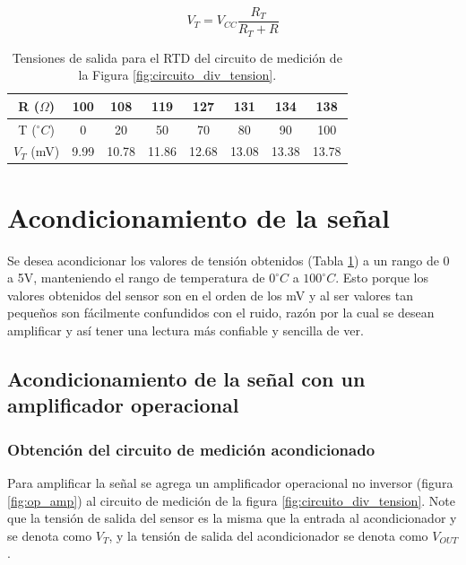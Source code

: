 \documentclass[journal,trans]{IEEEtran}
\begin{document}
\begin{equation} \label{eq:div_tension}
    V_{T} = V_{CC}\frac{R_{T}}{R_{T}+R}
\end{equation}

\begin{table}[htb]
    \begin{center}
        \caption{Tensiones de salida para el RTD del circuito de medición de la Figura \ref{fig:circuito_div_tension}.}
        \label{tab:tensiones_salida}
        \begin{tabular}{c | c | c | c | c | c | c | c}
            \hline
            R ($\Omega$) & 100 & 108 & 119 & 127 & 131 & 134 & 138 \\
            \hline
            T ($^{\circ}C$) & 0 & 20 & 50 & 70 & 80 & 90 & 100  \\
            \hline
            $V_{T}$ (mV) & 9.99 & 10.78 & 11.86 & 12.68 & 13.08 & 13.38 & 13.78  \\
            \hline
        \end{tabular}
    \end{center}
\end{table}


\section{Acondicionamiento de la señal }
Se desea acondicionar los valores de tensión obtenidos (Tabla \ref{tab:tensiones_salida}) a un rango de 0 a 5V, manteniendo el rango de temperatura de $0^{\circ}C$ a $100^{\circ}C$. Esto porque los valores obtenidos del sensor son en el orden de los mV y al ser valores tan pequeños son fácilmente confundidos con el ruido, razón por la cual se desean amplificar y así tener una lectura más confiable y sencilla de ver.

\subsection{Acondicionamiento de la señal con un amplificador operacional}
\subsubsection{Obtención del circuito de medición acondicionado}

Para amplificar la señal se agrega un amplificador operacional no inversor (figura \ref{fig:op_amp}) al circuito de medición de la figura \ref{fig:circuito_div_tension}. Note que la tensión de salida del sensor es la misma que la entrada al acondicionador y se denota como $V_{T}$, y la tensión de salida del acondicionador se denota como $V_{OUT}$.
\end{document}
